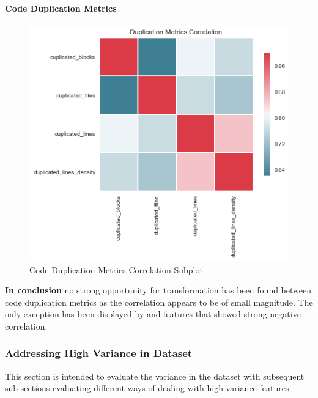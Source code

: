 \paragraph{Code Duplication Metrics}\label{sec:impl-data-analysis:corr:code-duplication}
\begin{figure}
    \centering
    \includegraphics[scale=0.75]{Figures/correlation/Duplication_Metrics_Correlation.png}
    \caption{Code Duplication Metrics Correlation Subplot}
    \label{fig:correlation-code-duplication-metrics-subplot}
\end{figure}


\textbf{In conclusion} no strong opportunity for transformation has been found between code duplication metrics as the correlation appears to be of small magnitude. The only exception has been displayed by \duplicatedBlocks{} and \duplicatedFiles{} features that showed strong negative correlation.
\FloatBarrier

\subsubsection{Addressing High Variance in Dataset}\label{sec:impl-data-analysis:dealing-with-variance}
This section is intended to evaluate the variance in the dataset with subsequent sub sections evaluating different ways of dealing with high variance features.